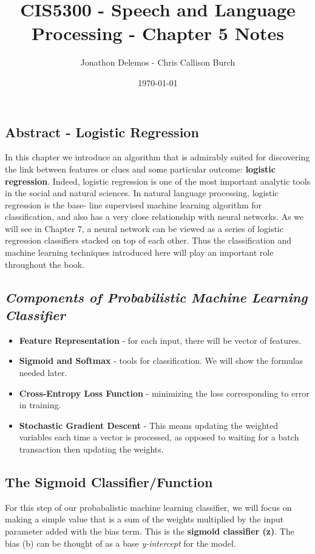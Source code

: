\documentclass{article}
\title{CIS5300 - Speech and Language Processing - Chapter 5 Notes}
\author{Jonathon Delemos - Chris Callison Burch}
\date{\today}
\begin{document}
\maketitle

\subsection{Abstract - Logistic Regression}

In this chapter we introduce an algorithm that is admirably suited for discovering
the link between features or clues and some particular outcome: \textbf{logistic regression}.
Indeed, logistic regression is one of the most important analytic tools in the social
and natural sciences. In natural language processing, logistic regression is the base-
line supervised machine learning algorithm for classification, and also has a very
close relationship with neural networks. As we will see in Chapter 7, a neural network can be viewed as a series of logistic regression classifiers stacked on top of
each other. Thus the classification and machine learning techniques introduced here
will play an important role throughout the book.


\subsection{\textit{Components of Probabilistic Machine Learning Classifier}}
\begin{itemize}
    \item \textbf{Feature Representation} - for each input, there will be  vector of features.
    \item \textbf{Sigmoid and Softmax} - tools for classification. We will show the formulas needed later.
    \item \textbf{Cross-Entropy Loss Function} - minimizing the loss corresponding to error in training.
    \item \textbf{Stochastic Gradient Descent} - This means updating the weighted variables each time a vector is processed, as opposed to waiting for a batch transaction then updating the weights.
\end{itemize}
\subsection{\textbf{The Sigmoid Classifier/Function}}
For this step of our probabalistic machine learning classifier, we will focus on making a simple value that is a sum
of the weights multiplied by the input parameter added with the bias term. This is the \textbf{sigmoid classifier (z)}. The bias (b) can be thought of as a base \textit{y-intercept} for the
model.
\end{document}
